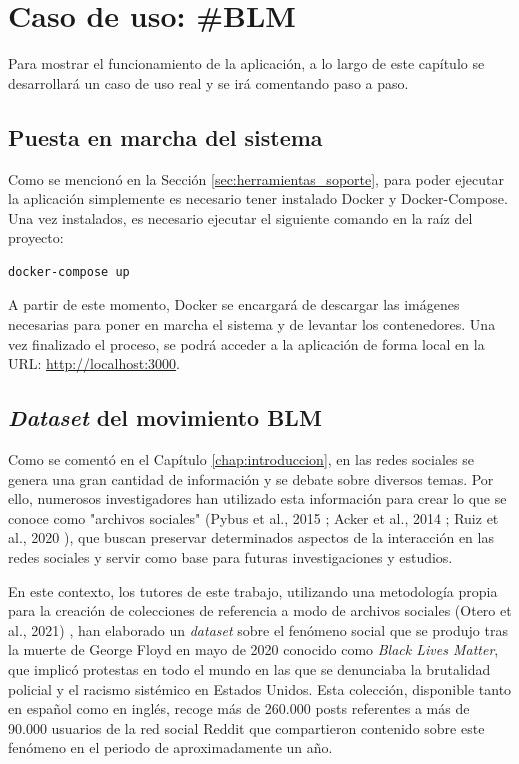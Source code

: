 \chapter{Caso de uso: \#BLM}
\label{chap:casouso}

Para mostrar el funcionamiento de la aplicación, a lo largo de este capítulo se desarrollará un caso de uso real y se irá
comentando paso a paso.

\section{Puesta en marcha del sistema}
\label{sec:casouso_puesta_en_marcha}

Como se mencionó en la Sección \ref{sec:herramientas_soporte}, para poder ejecutar la aplicación simplemente es necesario tener
instalado Docker y Docker-Compose. Una vez instalados, es necesario ejecutar el siguiente comando en la raíz del
proyecto:

\bigskip
\begin{Verbatim}
docker-compose up
\end{Verbatim}

\bigskip
A partir de este momento, Docker se encargará de descargar las imágenes necesarias para poner en marcha el sistema y de levantar los
contenedores. Una vez finalizado el proceso, se podrá acceder a la aplicación de forma local en la URL: \url{http://localhost:3000}.

\section{\textit{Dataset} del movimiento BLM}
\label{sec:casouso_dataset}

Como se comentó en el Capítulo \ref{chap:introduccion}, en las redes sociales se genera una gran cantidad de información y se debate sobre
diversos temas. Por ello, numerosos investigadores han utilizado esta información para crear lo que se conoce como "archivos sociales"
(Pybus et al., 2015 \cite{pybus2015hacking}; Acker et al., 2014 \cite{acker2014death}; Ruiz et al., 2020 \cite{ruiz2020cuentalo}),
que buscan preservar determinados aspectos de la interacción en las redes sociales y servir como base para futuras investigaciones
y estudios.

\bigskip
En este contexto, los tutores de este trabajo, utilizando una metodología propia para la creación de colecciones de referencia
a modo de archivos sociales
(Otero et al., 2021) \cite{oterorodilla2021}, han elaborado un \textit{dataset} sobre el fenómeno social
que se produjo tras la muerte de George Floyd en mayo de 2020 conocido como \textit{Black Lives Matter},
que implicó protestas en todo el mundo en las que se denunciaba la brutalidad policial y el racismo sistémico en Estados Unidos. Esta colección, 
disponible tanto en español como en inglés, recoge más de 260.000 posts referentes a más de 90.000 usuarios de la red social Reddit que compartieron contenido sobre este
fenómeno en el periodo de aproximadamente un año.

